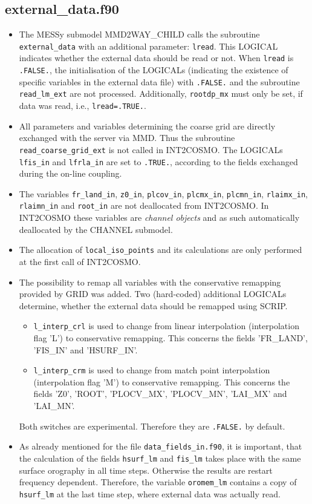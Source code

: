 \documentclass[11pt,twoside]{article}
\begin{document}
\subsection{external\_data.f90}\label{sec:tech_extdata}
\begin{itemize}
\item The MESSy submodel MMD2WAY\_CHILD calls the subroutine \verb|external_data|
with an additional parameter: \verb|lread|. This {\footnotesize LOGICAL}
indicates whether the external data should be read or not. 
When \verb|lread| is \verb|.FALSE.|, the initialisation of the
{\footnotesize LOGICALs} (indicating the existence of specific variables in the 
external data file) with \verb|.FALSE.| and the subroutine \verb|read_lm_ext| are
not processed. Additionally, \verb|rootdp_mx| must only be set, if data 
was read, i.e., \verb|lread=.TRUE.|.
\item All parameters and variables determining the coarse grid are directly 
exchanged with the server via MMD. Thus the subroutine 
\verb|read_coarse_grid_ext| is not called in INT2COSMO.
The {\footnotesize LOGICALs} \verb|lfis_in| and \verb|lfrla_in| are set to 
\verb|.TRUE.|, according to the fields exchanged during the on-line coupling.

\item The variables \verb|fr_land_in|, \verb|z0_in|, \verb|plcov_in|,
 \verb|plcmx_in|, \verb|plcmn_in|, \verb|rlaimx_in|, \verb|rlaimn_in| and
 \verb|root_in| are not deallocated from INT2COSMO.
In INT2COSMO these variables are {\it channel objects} and as such 
automatically deallocated by the CHANNEL submodel.
\item The allocation of \verb|local_iso_points| and its 
 calculations are only performed at the first call of INT2COSMO.
\item The possibility to remap all variables with the conservative
 remapping provided by GRID was added. Two (hard-coded) additional
 {\footnotesize LOGICALs} determine, whether the external data should
 be remapped using SCRIP.
\begin{itemize}
\item  \verb|l_interp_crl| is used to change from linear interpolation
 (interpolation flag 'L') to conservative remapping. This concerns the
 fields 'FR\_LAND', 'FIS\_IN' and 'HSURF\_IN'.
\item  \verb|l_interp_crm| is used to change from match point
 interpolation (interpolation flag 'M') to conservative
 remapping. This concerns the fields
 'Z0', 'ROOT', 'PLOCV\_MX', 'PLOCV\_MN', 'LAI\_MX' and 'LAI\_MN'.
\end{itemize}
Both switches are experimental. Therefore they are \verb|.FALSE.| by default.

\item As already mentioned for the file \verb|data_fields_in.f90|, it
is important, that the calculation of the fields \verb|hsurf_lm|
and \verb|fis_lm| takes place with the same surface orography in
all time steps. Otherwise the results are restart frequency
dependent. Therefore, 
the variable \verb|oromem_lm| contains a copy of \verb|hsurf_lm| at
the last time step, where external data was actually read. 

\end{itemize}
\end{document}
